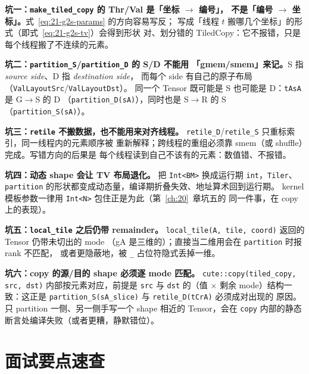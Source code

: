 \textbf{坑一：\texttt{make\_\allowbreak{}tiled\_\allowbreak{}copy} 的 Thr/Val 是「坐标 $\to$ 编号」，
不是「编号 $\to$ 坐标」。}式~\eqref{eq:21-g2s-params} 的方向容易写反；
写成「线程 $t$ 搬哪几个坐标」的形式（即式~\eqref{eq:21-g2s-tv}）会得到形状
对、划分错的 TiledCopy：它不报错，只是每个线程搬了不连续的元素。

\textbf{坑二：\texttt{partition\_S}/\texttt{partition\_D} 的 S/D 不能用
「gmem/smem」来记。}\allowbreak{}S 指 \emph{source side}、D 指 \emph{destination side}，
而每个 side 有自己的原子布局（\texttt{Val\allowbreak{}Layout\allowbreak{}Src}/\texttt{Val\allowbreak{}Layout\allowbreak{}Dst}）。
同一个 Tensor 既可能是 S 也可能是 D：\texttt{tAsA} 是 G$\to$S 的 D
（\texttt{partition\_\allowbreak{}D\allowbreak{}(s\allowbreak{}A)}），同时也是 S$\to$R 的 S
（\texttt{partition\_\allowbreak{}S\allowbreak{}(s\allowbreak{}A)}）。

\textbf{坑三：\texttt{retile} 不搬数据，也不能用来对齐线程。}
\texttt{retile\_D}/\texttt{retile\_S} 只重标索引，同一线程内的元素顺序被
重新解释；跨线程的重组必须靠 smem（或 shuffle）完成。写错方向的后果是
每个线程读到自己不该有的元素：数值错、不报错。

\textbf{坑四：动态 shape 会让 TV 布局退化。}
把 \texttt{Int<BM>} 换成运行期 \texttt{int}，\texttt{Tiler}、
\texttt{partition} 的形状都变成动态量，编译期折叠失效、地址算术回到运行期。
kernel 模板参数一律用 \texttt{Int<N>} 包住正是为此（第~\ref{ch:20}~章坑五的
同一件事，在 copy 上的表现）。

\textbf{坑五：\texttt{local\_tile} 之后仍带 remainder。}
\texttt{local\_\allowbreak{}tile\allowbreak{}(A,\allowbreak{} tile,\allowbreak{} coord)} 返回的 Tensor 仍带未切出的 mode
（gA 是三维的）；直接当二维用会在 \texttt{partition} 时报 rank 不匹配，
或者更隐蔽地，被 \texttt{\_} 占位符隐式丢掉一维。

\textbf{坑六：copy 的源/目的 shape 必须逐 mode 匹配。}
\texttt{cute::\allowbreak{}copy\allowbreak{}(tiled\_\allowbreak{}copy,\allowbreak{} src,\allowbreak{} dst)} 内部按元素对应，前提是
\texttt{src} 与 \texttt{dst} 的（值 $\times$ 剩余 mode）结构一致：这正是
\texttt{partition\_\allowbreak{}S\allowbreak{}(s\allowbreak{}A\_\allowbreak{}slice)} 与 \texttt{retile\_\allowbreak{}D\allowbreak{}(t\allowbreak{}Cr\allowbreak{}A)} 必须成对出现的
原因。只 partition 一侧、另一侧手写一个 shape 相近的 Tensor，会在
\texttt{copy} 内部的静态断言处编译失败（或者更糟，静默错位）。

\section{面试要点速查}

